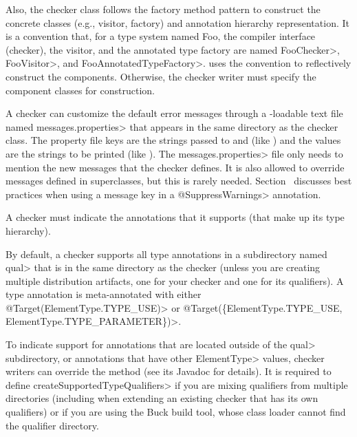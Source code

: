 Also, the checker class follows the factory method pattern to
construct the concrete classes (e.g., visitor, factory) and annotation
hierarchy representation.  It is a convention that, for
a type system named Foo, the compiler
interface (checker), the visitor, and the annotated type factory are
named \<FooChecker>, \<FooVisitor>, and \<FooAnnotatedTypeFactory>.
 uses the convention to
reflectively construct the components.  Otherwise, the checker writer
must specify the component classes for construction.

\begin{sloppypar}
A checker can customize the default error messages through a
-loadable text file named
\<messages.properties> that appears in the same directory as the checker class.
The property file keys are the strings passed to 
and
(like ) and the values are the strings to be
printed (like ).
The \<messages.properties> file only needs to mention the new messages that
the checker defines.
It is also allowed to override messages defined in superclasses, but this
is rarely needed.
Section~ discusses best practices
when using a message key in a \<@SuppressWarnings> annotation.
\end{sloppypar}


A checker must indicate the annotations that it supports (that make up its type
hierarchy).

By default, a checker supports all type annotations in a
subdirectory named \<qual> that is in the same directory as the
checker (unless you are creating multiple distribution artifacts, one for your
checker and one for its qualifiers).
A type annotation is meta-annotated with either
\<@Target(ElementType.TYPE\_USE)>
or
\<@Target(\{ElementType.TYPE\_USE, ElementType.TYPE\_PARAMETER\})>.

To indicate support for annotations that are located outside of the \<qual>
subdirectory, or annotations that have other \<ElementType> values,
checker writers can override the
method (see its Javadoc for details).
It is required to define \<createSupportedTypeQualifiers> if you are mixing
qualifiers from multiple directories (including when extending an existing
checker that has its own qualifiers) or if you are using the Buck build
tool, whose class loader cannot find the qualifier directory.

